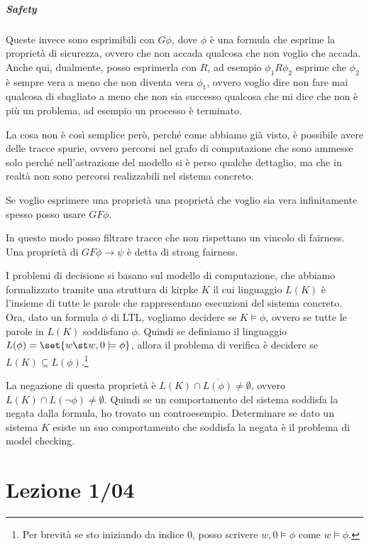\paragraph{Safety}
Queste invece sono esprimibili con \(G\phi\), dove \(\phi\) è una formula che esprime la proprietà di sicurezza, ovvero che non accada qualcosa che non voglio che accada. Anche qui, dualmente, posso esprimerla con \(R\), ad esempio \(\phi_1 R \phi_2\) esprime che \(\phi_2\) è sempre vera a meno che non diventa vera \(\phi_1\), ovvero voglio dire non fare mai qualcosa di sbagliato a meno che non sia successo qualcosa che mi dice che non è più un problema, ad esempio un processo è terminato.

La cosa non è così semplice però, perché come abbiamo già visto, è possibile avere delle tracce spurie, ovvero percorsi nel grafo di computazione che sono ammesse solo perché nell'astrazione del modello si è perso qualche dettaglio, ma che in realtà non sono percorsi realizzabili nel sistema concreto.

Se voglio esprimere una proprietà una proprietà che voglio sia vera infinitamente spesso posso usare \(G F \phi\).

In questo modo posso filtrare tracce che non rispettano un vincolo di fairness. Una proprietà di \(G F \phi \to \psi\) è detta di strong fairness.

I problemi di decisione si basano sul modello di computazione, che abbiamo formalizzato tramite una struttura di kirpke \(K\) il cui linguaggio \(L(K)\) è l'insieme di tutte le parole che rappresentano esecuzioni del sistema concreto. Ora, dato un formula \(\phi\) di LTL\@, vogliamo decidere se \(K \models \phi\), ovvero se tutte le parole in \(L(K)\) soddisfano \(\phi\). Quindi se definiamo il linguaggio \(L(\phi) = \set{w \st w,0 \models \phi}\), allora il problema di verifica è decidere se \(L(K) \subseteq L(\phi)\).\footnote{Per brevità se sto iniziando da indice \(0\), posso scrivere \(w,0\models \phi\) come \(w\models \phi\).}

La negazione di questa proprietà è \(L(K) \cap \overline{L(\phi)} \neq \emptyset\), ovvero \(L(K) \cap L(\neg \phi) \neq \emptyset\). Quindi se un comportamento del sistema soddisfa la negata dalla formula, ho trovato un controesempio. Determinare se dato un sistema \(K\) esiste un suo comportamento che soddisfa la negata è il problema di model checking.

\chapter{Lezione 1/04}

